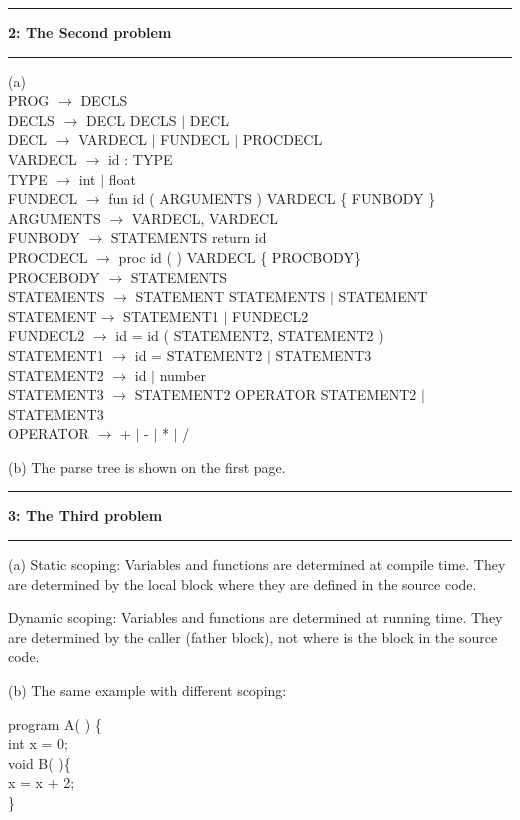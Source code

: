 \documentclass[11pt]{article}
\newcommand\question[2]{\vspace{.25in}\hrule\textbf{#1: #2}\vspace{.5em}\hrule\vspace{.10in}}
\begin{document}
\question{2}{The Second problem}
(a)\\ 
PROG $\rightarrow$ DECLS\\
DECLS $\rightarrow$ DECL DECLS $|$ DECL\\
DECL $\rightarrow$ VARDECL $|$ FUNDECL $|$ PROCDECL\\
VARDECL $\rightarrow$ id : TYPE\\
TYPE $\rightarrow$ int $|$ float\\
FUNDECL $\rightarrow$ fun id ( ARGUMENTS )  VARDECL \{ FUNBODY \} \\
ARGUMENTS $\rightarrow$  VARDECL,  VARDECL  \\
FUNBODY $\rightarrow$ STATEMENTS  return id \\
PROCDECL $\rightarrow$ proc id ( )  VARDECL \{ PROCBODY\}\\
PROCEBODY $\rightarrow$   STATEMENTS\\
STATEMENTS $\rightarrow$ STATEMENT STATEMENTS $|$ STATEMENT\\
STATEMENT$\rightarrow$ STATEMENT1 $|$ FUNDECL2 \\
FUNDECL2 $\rightarrow$ id = id ( STATEMENT2, STATEMENT2 )\\
STATEMENT1 $\rightarrow$ id  = STATEMENT2 $|$ STATEMENT3\\
STATEMENT2 $\rightarrow$  id $|$ number\\
STATEMENT3 $\rightarrow$ STATEMENT2 OPERATOR STATEMENT2 $|$ STATEMENT3\\
OPERATOR $\rightarrow$ + $|$ - $|$ * $|$ /



(b) The parse tree is shown on the first page.



\question{3}{The Third problem}

(a) Static scoping: Variables and functions are determined at compile time. They are determined by the local block where they are defined in the source code. 

Dynamic scoping: Variables and functions are determined at running time. They are determined by the caller (father block), not where is the block in the source code.


(b) The same example with different scoping:

program A( ) \{\\
int x = 0;\\
void B( )\{\\
\qquad x = x + 2;\\
\}
\end{document}
